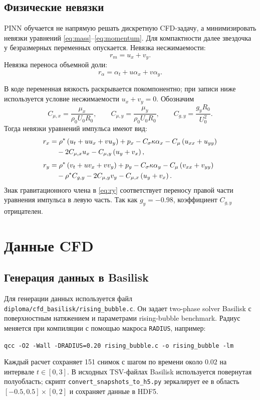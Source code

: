 \documentclass[12pt,a4paper]{article}
\newcommand{\Rbase}{R_0}
\newcommand{\Uref}{U_0}
\newcommand{\rhoref}{\rho_0}
\begin{document}
\subsection{Физические невязки}

PINN обучается не напрямую решать дискретную CFD-задачу, а минимизировать
невязки уравнений \eqref{eq:mass}--\eqref{eq:momentum}. Для компактности далее
звездочка у безразмерных переменных опускается. Невязка несжимаемости:
\begin{equation}
    r_m=u_x+v_y.
\end{equation}
Невязка переноса объемной доли:
\begin{equation}
    r_\alpha=\alpha_t+u\alpha_x+v\alpha_y.
\end{equation}

В коде переменная вязкость раскрывается покомпонентно; при записи ниже
используется условие несжимаемости \(u_x+v_y=0\). Обозначим
\[
    C_{\mu,x}=\frac{\mu_x}{\rhoref\Uref\Rbase},
    \qquad
    C_{\mu,y}=\frac{\mu_y}{\rhoref\Uref\Rbase},
    \qquad
    C_{g,y}=\frac{g_y\Rbase}{\Uref^2}.
\]
Тогда невязки уравнений импульса имеют вид:
\begin{align}
    r_x
    &=
    \rho^*
    \left(u_t+uu_x+vu_y\right)
    +p_x
    -C_\sigma\kappa\alpha_x
    -C_\mu\left(u_{xx}+u_{yy}\right)
    \notag\\
    &\quad
    -2C_{\mu,x}u_x
    -C_{\mu,y}\left(u_y+v_x\right),
    \label{eq:rx}
    \\[0.4em]
    r_y
    &=
    \rho^*
    \left(v_t+uv_x+vv_y\right)
    +p_y
    -C_\sigma\kappa\alpha_y
    -C_\mu\left(v_{xx}+v_{yy}\right)
    \notag\\
    &\quad
    -\rho^*C_{g,y}
    -2C_{\mu,y}v_y
    -C_{\mu,x}\left(u_y+v_x\right).
    \label{eq:ry}
\end{align}
Знак гравитационного члена в \eqref{eq:ry} соответствует переносу правой части
уравнения импульса в левую часть. Так как \(g_y=-0.98\), коэффициент
\(C_{g,y}\) отрицателен.

\section{Данные CFD}

\subsection{Генерация данных в Basilisk}

Для генерации данных используется файл
\texttt{diploma/cfd\_basilisk/rising\_bubble.c}. Он задает two-phase solver
Basilisk с поверхностным натяжением и параметрами rising-bubble benchmark.
Радиус меняется при компиляции с помощью макроса \texttt{RADIUS}, например:
\begin{center}
    \texttt{qcc -O2 -Wall -DRADIUS=0.20 rising\_bubble.c -o rising\_bubble -lm}
\end{center}
Каждый расчет сохраняет 151 снимок с шагом по времени около \(0.02\) на
интервале \(t\in[0,3]\). В исходных TSV-файлах Basilisk используется повернутая
полуобласть; скрипт \texttt{convert\_snapshots\_to\_h5.py} зеркалирует ее в
область \([-0.5,0.5]\times[0,2]\) и сохраняет данные в HDF5.
\end{document}
